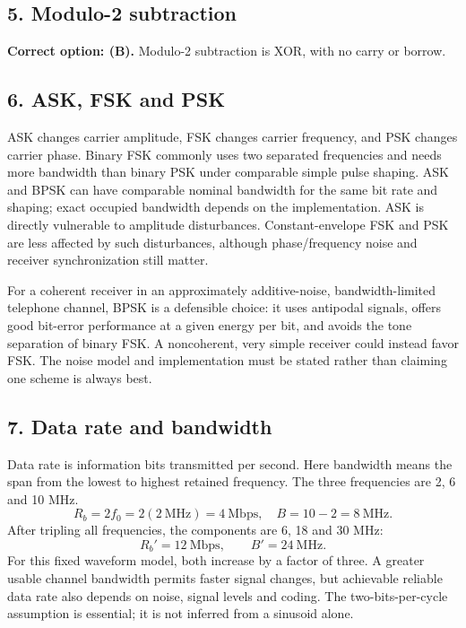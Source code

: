 \documentclass[11pt,a4paper]{article}
\begin{document}
\noindent\begin{minipage}{\linewidth}\subsection*{5. Modulo-2 subtraction}
\textbf{Correct option: (B).} Modulo-2 subtraction is XOR, with no carry or borrow.
\end{minipage}\par\medskip
\noindent\begin{minipage}{\linewidth}\subsection*{6. ASK, FSK and PSK}

ASK changes carrier amplitude, FSK changes carrier frequency, and PSK changes carrier phase. Binary FSK commonly uses two separated frequencies and needs more bandwidth than binary PSK under comparable simple pulse shaping. ASK and BPSK can have comparable nominal bandwidth for the same bit rate and shaping; exact occupied bandwidth depends on the implementation. ASK is directly vulnerable to amplitude disturbances. Constant-envelope FSK and PSK are less affected by such disturbances, although phase/frequency noise and receiver synchronization still matter.

For a coherent receiver in an approximately additive-noise, bandwidth-limited telephone channel, BPSK is a defensible choice: it uses antipodal signals, offers good bit-error performance at a given energy per bit, and avoids the tone separation of binary FSK. A noncoherent, very simple receiver could instead favor FSK. The noise model and implementation must be stated rather than claiming one scheme is always best.
\end{minipage}\par\medskip
\noindent\begin{minipage}{\linewidth}\subsection*{7. Data rate and bandwidth}

Data rate is information bits transmitted per second. Here bandwidth means the span from the lowest to highest retained frequency. The three frequencies are 2, 6 and 10 MHz.
\[R_b=2f_0=2(2\ \mathrm{MHz})=\boxed{4\ \mathrm{Mbps}},\quad
B=10-2=\boxed{8\ \mathrm{MHz}}.\]
After tripling all frequencies, the components are 6, 18 and 30 MHz:
\[R_b'=\boxed{12\ \mathrm{Mbps}},\qquad B'=\boxed{24\ \mathrm{MHz}}.\]
For this fixed waveform model, both increase by a factor of three. A greater usable channel bandwidth permits faster signal changes, but achievable reliable data rate also depends on noise, signal levels and coding. The two-bits-per-cycle assumption is essential; it is not inferred from a sinusoid alone.
\end{minipage}\par\medskip
\end{document}
